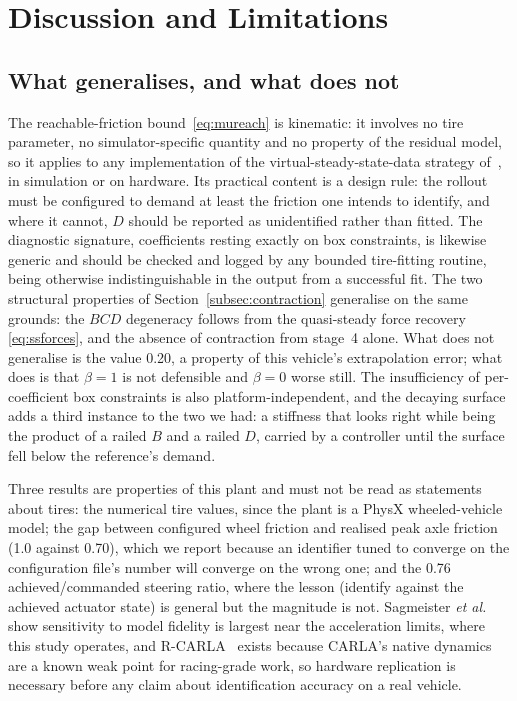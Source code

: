 \section{Discussion and Limitations}
\label{sec:disc}

\subsection{What generalises, and what does not}

The reachable-friction bound~\eqref{eq:mureach} is kinematic: it involves no
tire parameter, no simulator-specific quantity and no property of the residual
model, so it applies to any implementation of the virtual-steady-state-data
strategy of~\cite{ontrack2025}, in simulation or on hardware. Its practical
content is a design rule: the rollout must be configured to demand at least the
friction one intends to identify, and where it cannot, $D$ should be reported
as unidentified rather than fitted. The diagnostic signature, coefficients
resting exactly on box constraints, is likewise generic and should be checked
and logged by any bounded tire-fitting routine, being otherwise
indistinguishable in the output from a successful fit. The two structural
properties of Section~\ref{subsec:contraction} generalise on the same grounds:
the $BCD$ degeneracy follows from the quasi-steady force recovery
\eqref{eq:ssforces}, and the absence of contraction from stage~4 alone. What
does not generalise is the value \num{0.20}, a property of this vehicle's
extrapolation error; what does is that $\beta=1$ is not defensible and
$\beta=0$ worse still. The insufficiency of per-coefficient box constraints is
also platform-independent, and the decaying surface adds a third instance to
the two we had: a stiffness that looks right while being the product of a
railed $B$ and a railed $D$, carried by a controller until the surface fell
below the reference's demand.

Three results are properties of this plant and must not be read as statements
about tires: the numerical tire values, since the plant is a PhysX
wheeled-vehicle model; the gap between configured wheel friction and realised
peak axle friction (\num{1.0} against \num{0.70}), which we report because an
identifier tuned to converge on the configuration file's number will converge
on the wrong one; and the \num{0.76} achieved/commanded steering ratio, where
the lesson (identify against the achieved actuator state) is general but the
magnitude is not. Sagmeister
\emph{et al.}~\cite{simfidelity2026} show sensitivity to model fidelity is
largest near the acceleration limits, where this study operates, and
R-CARLA~\cite{rcarla2025} exists because CARLA's native dynamics are a known
weak point for racing-grade work, so hardware replication is necessary before
any claim about identification accuracy on a real vehicle.


